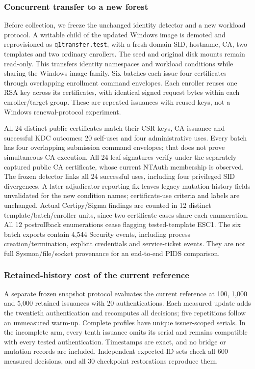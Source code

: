 \subsubsection{Concurrent transfer to a new forest}
Before collection, we freeze the unchanged identity detector and a new workload protocol. A writable child of the updated Windows image is demoted and reprovisioned as \texttt{q1transfer.test}, with a fresh domain SID, hostname, CA, two templates and two ordinary enrollers. The seed and original disk mounts remain read-only. This transfers identity namespaces and workload conditions while sharing the Windows image family. Six batches each issue four certificates through overlapping enrollment command envelopes. Each enroller reuses one RSA key across its certificates, with identical signed request bytes within each enroller/target group. These are repeated issuances with reused keys, not a Windows renewal-protocol experiment.

All 24 distinct public certificates match their CSR keys, CA issuance and successful KDC outcomes: 20 self-uses and four administrative uses. Every batch has four overlapping submission command envelopes; that does not prove simultaneous CA execution. All 24 leaf signatures verify under the separately captured public CA certificate, whose current NTAuth membership is observed. The frozen detector links all 24 successful uses, including four privileged SID divergences. A later adjudicator reporting fix leaves legacy mutation-history fields unvalidated for the new condition names; certificate-use criteria and labels are unchanged. Actual Certipy/Sigma findings are counted in 12 distinct template/batch/enroller units, since two certificate cases share each enumeration. All 12 postrollback enumerations cease flagging tested-template ESC1. The six batch exports contain 4,544 Security events, including process creation/termination, explicit credentials and service-ticket events. They are not full Sysmon/file/socket provenance for an end-to-end PIDS comparison.

\subsubsection{Retained-history cost of the current reference}
A separate frozen snapshot protocol evaluates the current reference at 100, 1,000 and 5,000 retained issuances with 20 authentications. Each measured update adds the twentieth authentication and recomputes all decisions; five repetitions follow an unmeasured warm-up. Complete profiles have unique issuer-scoped serials. In the incomplete arm, every tenth issuance omits its serial and remains compatible with every tested authentication. Timestamps are exact, and no bridge or mutation records are included. Independent expected-ID sets check all 600 measured decisions, and all 30 checkpoint restorations reproduce them.

